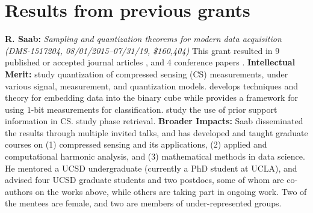 
\section{Results from previous grants}
{\bf R. Saab:} {\em Sampling and quantization theorems for modern data acquisition (DMS-1517204, 08/01/2015--07/31/19,
\$160,404)}
This grant resulted in 9 published or accepted journal articles \cite{knudson2016one, mansour2017recovery, needell2017weighted, SaabIEEEIT, needell2018simple, LybrandSaab2018, iwen2018phase, huynh2018fast, feng2019quantized}, and 4 conference papers \cite{needell2017simple, feng2017quantized, iwen2018phase, iwen2019new}.  {\bf Intellectual Merit:}  \cite{knudson2016one, SaabIEEEIT, feng2019quantized, LybrandSaab2018, iwen2019new} study quantization of compressed sensing (CS) measurements, under various signal, measurement, and quantization models. \cite{huynh2018fast} develops techniques and theory for embedding data into the binary cube while  \cite{needell2018simple} provides a framework for using $1$-bit  measurements for classification. \cite{mansour2017recovery, needell2017weighted} study  the use of prior support information  in CS. \cite{iwen2018phase, iwen2017phase} study phase retrieval. %
{\bf Broader Impacts: }  Saab disseminated the results through multiple invited talks, and has developed and taught graduate courses on (1) compressed sensing and its applications, (2) applied and computational harmonic analysis, and (3) mathematical methods in data science. He mentored a UCSD undergraduate (currently a PhD student at UCLA), and advised four UCSD graduate students and two postdocs,  some of whom are co-authors on the works above, while others are taking part in ongoing work. Two of the  mentees are female, and two are members of under-represented groups.%

